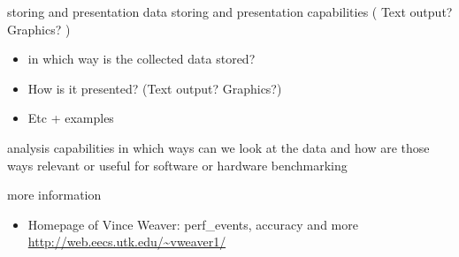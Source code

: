 \begin{frame}{storing and presentation}
data storing and presentation capabilities (  Text output? Graphics? )
\begin{itemize}
  \item in which way is the collected data stored?
  \item How is it presented? (Text output? Graphics?)
  \item Etc + examples
\end{itemize}
\end{frame}

\begin{frame}{analysis capabilities}
in which ways can we look at the data and how are those ways relevant or useful for software or hardware benchmarking
\end{frame}

\begin{frame}{more information}
\begin{itemize}
  \item Homepage of Vince Weaver: perf\_events, accuracy and more
    \url{http://web.eecs.utk.edu/~vweaver1/}
\end{itemize}
\end{frame}




